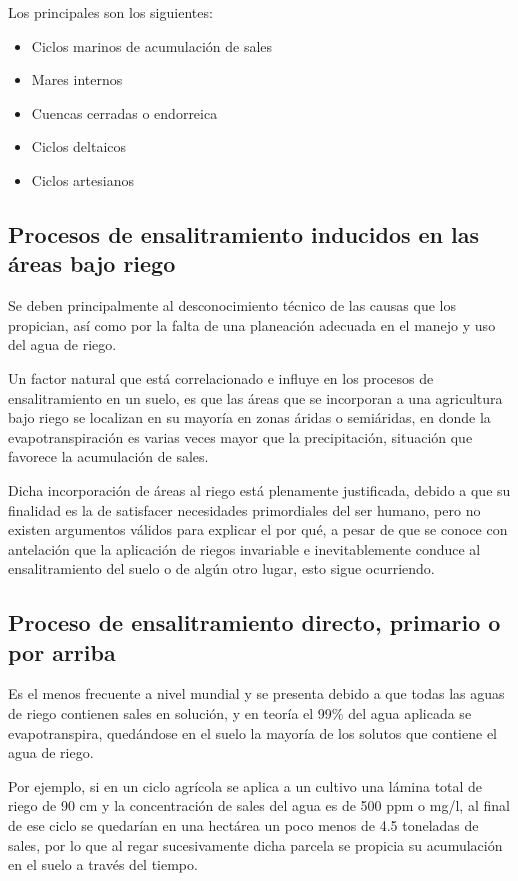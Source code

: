 Los principales son los siguientes:
\begin{itemize}
  \item Ciclos marinos de acumulación de sales
  \item Mares internos
  \item Cuencas cerradas o endorreica
  \item Ciclos deltaicos
  \item Ciclos artesianos
\end{itemize}
\subsection{Procesos de ensalitramiento inducidos en las áreas bajo riego}
Se deben principalmente al desconocimiento técnico de las causas que los propician, así como por la falta de una planeación adecuada en el manejo y uso del agua de riego.

Un factor natural que está correlacionado e influye en los procesos de ensalitramiento en un suelo, es que las áreas que se incorporan a una agricultura bajo riego se localizan en su mayoría en zonas áridas o semiáridas, en donde la evapotranspiración es varias veces mayor que la precipitación, situación que favorece la acumulación de sales.

Dicha incorporación de áreas al riego está plenamente justificada, debido a que su finalidad es la de satisfacer necesidades primordiales del ser humano, pero no existen argumentos válidos para explicar el por qué, a pesar de que se conoce con antelación que la aplicación de riegos invariable e inevitablemente conduce al ensalitramiento del suelo o de algún otro lugar, esto sigue ocurriendo.

\subsection{Proceso de ensalitramiento directo, primario o por arriba}
Es el menos frecuente a nivel mundial y se presenta debido a que todas las aguas de riego contienen sales en solución, y en teoría el 99\% del agua aplicada se evapotranspira, quedándose en el suelo la mayoría de los solutos que contiene el agua de riego.

Por ejemplo, si en un ciclo agrícola se aplica a un cultivo una lámina total de riego de 90 cm y la concentración de sales del agua es de 500 ppm o mg/l, al final de ese ciclo se quedarían en una hectárea un poco menos de 4.5 toneladas de sales, por lo que al regar sucesivamente dicha parcela se propicia su acumulación en el suelo a través del tiempo.

